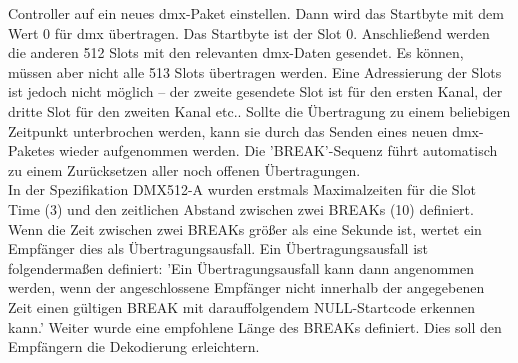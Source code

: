 \documentclass[11pt]{scrartcl}
\begin{document}
Controller auf ein neues \ac{dmx}-Paket einstellen. Dann wird das Startbyte mit dem Wert 0 für \ac{dmx}
übertragen. Das Startbyte ist der Slot 0. Anschließend werden die anderen 512 Slots mit den
relevanten \ac{dmx}-Daten gesendet. Es können, müssen aber nicht alle 513 Slots übertragen werden.
Eine Adressierung der Slots ist jedoch nicht möglich – der zweite gesendete Slot ist für den ersten
Kanal, der dritte Slot für den zweiten Kanal etc.. Sollte die Übertragung zu einem beliebigen
Zeitpunkt unterbrochen werden, kann sie durch das Senden eines neuen \ac{dmx}-Paketes wieder
aufgenommen werden. Die 'BREAK'-Sequenz führt automatisch zu einem Zurücksetzen aller noch
offenen Übertragungen.\\
\noindent
In der Spezifikation DMX512-A wurden erstmals Maximalzeiten für die Slot Time (3) und den
zeitlichen Abstand zwischen zwei BREAKs (10) definiert. Wenn die Zeit zwischen zwei BREAKs größer
als eine Sekunde ist, wertet ein Empfänger dies als Übertragungsausfall. Ein Übertragungsausfall ist
folgendermaßen definiert: 'Ein Übertragungsausfall kann dann angenommen werden, wenn der
angeschlossene Empfänger nicht innerhalb der angegebenen Zeit einen gültigen BREAK mit
darauffolgendem NULL-Startcode erkennen kann.' Weiter wurde eine empfohlene Länge des
BREAKs definiert. Dies soll den Empfängern die Dekodierung erleichtern.
\clearpage
\end{document}
